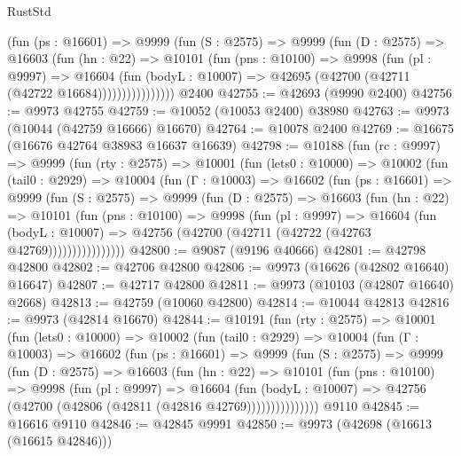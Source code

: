 \begin{lexlean}{RustStd}
\begin{coremodule}
                (fun (ps : @16601) =>
                @9999
                  (fun (S : @2575) =>
                  @9999
                    (fun (D : @2575) =>
                    @16603
                      (fun (hn : @22) =>
                      @10101
                        (fun (pns : @10100) =>
                        @9998
                          (fun (pl : @9997) =>
                          @16604
                            (fun (bodyL : @10007) =>
                            @42695 (@42700 (@42711 (@42722 @16684))))))))))))))))
    @2400
@42755 := @42693 (@9990 @2400)
@42756 := @9973 @42755
@42759 := @10052 (@10053 @2400) @38980
@42763 := @9973 (@10044 (@42759 @16666) @16670)
@42764 := @10078 @2400
@42769 := @16675 (@16676 @42764 @38983 @16637 @16639)
@42798 := @10188
    (fun (rc : @9997) =>
    @9999
      (fun (rty : @2575) =>
      @10001
        (fun (lets0 : @10000) =>
        @10002
          (fun (tail0 : @2929) =>
          @10004
            (fun (Γ : @10003) =>
            @16602
              (fun (ps : @16601) =>
              @9999
                (fun (S : @2575) =>
                @9999
                  (fun (D : @2575) =>
                  @16603
                    (fun (hn : @22) =>
                    @10101
                      (fun (pns : @10100) =>
                      @9998
                        (fun (pl : @9997) =>
                        @16604
                          (fun (bodyL : @10007) =>
                          @42756 (@42700 (@42711 (@42722 (@42763 @42769))))))))))))))))
@42800 := @9087 (@9196 @40666)
@42801 := @42798 @42800
@42802 := @42706 @42800
@42806 := @9973 (@16626 (@42802 @16640) @16647)
@42807 := @42717 @42800
@42811 := @9973 (@10103 (@42807 @16640) @2668)
@42813 := @42759 (@10060 @42800)
@42814 := @10044 @42813
@42816 := @9973 (@42814 @16670)
@42844 := @10191
    (fun (rty : @2575) =>
    @10001
      (fun (lets0 : @10000) =>
      @10002
        (fun (tail0 : @2929) =>
        @10004
          (fun (Γ : @10003) =>
          @16602
            (fun (ps : @16601) =>
            @9999
              (fun (S : @2575) =>
              @9999
                (fun (D : @2575) =>
                @16603
                  (fun (hn : @22) =>
                  @10101
                    (fun (pns : @10100) =>
                    @9998
                      (fun (pl : @9997) =>
                      @16604
                        (fun (bodyL : @10007) =>
                        @42756 (@42700 (@42806 (@42811 (@42816 @42769)))))))))))))))
    @9110
@42845 := @16616 @9110
@42846 := @42845 @9991
@42850 := @9973 (@42698 (@16613 (@16615 @42846)))

\end{coremodule}
\end{lexlean}
